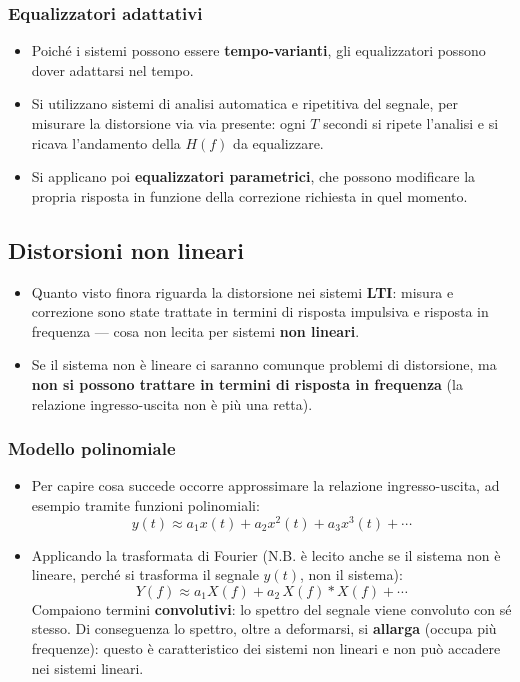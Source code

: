 \documentclass[12pt, a4paper]{article}
\begin{document}
\subsubsection{Equalizzatori adattativi}
\begin{itemize}
    \item Poiché i sistemi possono essere \textbf{tempo-varianti}, gli equalizzatori possono dover adattarsi nel tempo.
    \item Si utilizzano sistemi di analisi automatica e ripetitiva del segnale, per misurare la distorsione via via presente: ogni $T$ secondi si ripete l'analisi e si ricava l'andamento della $H(f)$ da equalizzare.
    \item Si applicano poi \textbf{equalizzatori parametrici}, che possono modificare la propria risposta in funzione della correzione richiesta in quel momento.
\end{itemize}

\subsection{Distorsioni non lineari}
\begin{itemize}
    \item Quanto visto finora riguarda la distorsione nei sistemi \textbf{LTI}: misura e correzione sono state trattate in termini di risposta impulsiva e risposta in frequenza — cosa non lecita per sistemi \textbf{non lineari}.
    \item Se il sistema non è lineare ci saranno comunque problemi di distorsione, ma \textbf{non si possono trattare in termini di risposta in frequenza} (la relazione ingresso-uscita non è più una retta).
\end{itemize}

\subsubsection{Modello polinomiale}
\begin{itemize}
    \item Per capire cosa succede occorre approssimare la relazione ingresso-uscita, ad esempio tramite funzioni polinomiali:
    $$y(t) \approx a_1x(t)+a_2x^2(t)+a_3x^3(t)+\cdots$$
    \item Applicando la trasformata di Fourier (N.B. è lecito anche se il sistema non è lineare, perché si trasforma il segnale $y(t)$, non il sistema):
    $$Y(f) \approx a_1X(f) + a_2\,X(f)*X(f) + \cdots$$
    Compaiono termini \textbf{convolutivi}: lo spettro del segnale viene convoluto con sé stesso. Di conseguenza lo spettro, oltre a deformarsi, si \textbf{allarga} (occupa più frequenze): questo è caratteristico dei sistemi non lineari e non può accadere nei sistemi lineari.
\end{itemize}
\end{document}
